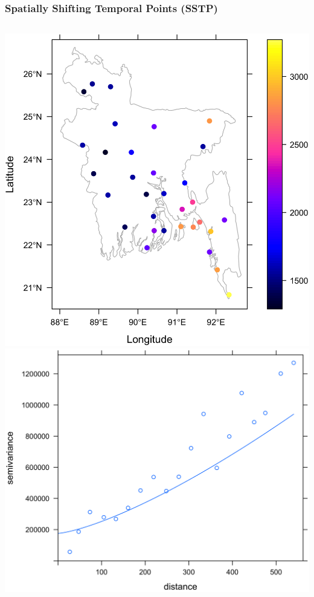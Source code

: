 \documentclass[10pt, compress]{beamer}
\begin{document}

\begin{frame}
  \frametitle{Spatially Shifting Temporal Points (SSTP)}
  {\begin{columns}
  \column{5cm}
    \centering
    \includegraphics[width=1.15\textwidth]{images/SSTP6.png}
    \column{5cm}
    \centering
    \includegraphics[width=1.15\textwidth]{images/SSTP1.png}

\end{columns}}
\end{frame}
\end{document}
